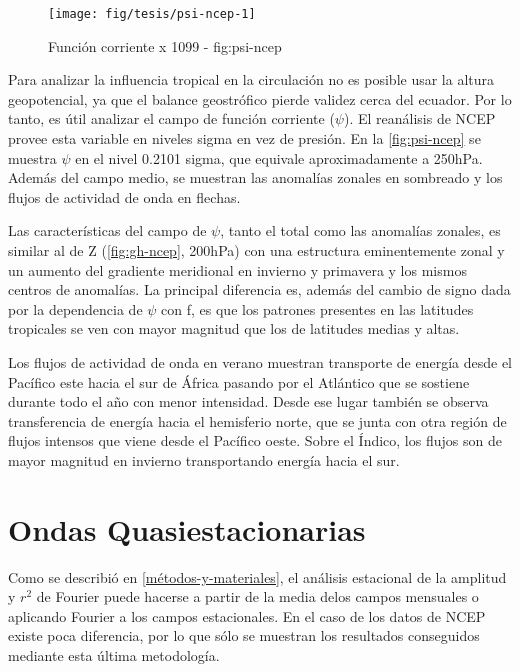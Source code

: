\documentclass[spanish,a4paper]{book}
\begin{document}
\begin{figure}

{\centering \texttt{[image: fig/tesis/psi-ncep-1]} 

}

\caption{Función corriente x 1099 - fig:psi-ncep}\label{fig:psi-ncep}
\end{figure}

Para analizar la influencia tropical en la circulación no es posible
usar la altura geopotencial, ya que el balance geostrófico pierde
validez cerca del ecuador. Por lo tanto, es útil analizar el campo de
función corriente (\(\psi\)). El reanálisis de NCEP provee esta variable
en niveles sigma en vez de presión. En la \autoref{fig:psi-ncep} se
muestra \(\psi\) en el nivel 0.2101 sigma, que equivale aproximadamente
a 250hPa. Además del campo medio, se muestran las anomalías zonales en
sombreado y los flujos de actividad de onda en flechas.

Las características del campo de \(\psi\), tanto el total como las
anomalías zonales, es similar al de Z (\autoref{fig:gh-ncep}, 200hPa)
con una estructura eminentemente zonal y un aumento del gradiente
meridional en invierno y primavera y los mismos centros de anomalías. La
principal diferencia es, además del cambio de signo dada por la
dependencia de \(\psi\) con f, es que los patrones presentes en las
latitudes tropicales se ven con mayor magnitud que los de latitudes
medias y altas.

Los flujos de actividad de onda en verano muestran transporte de energía
desde el Pacífico este hacia el sur de África pasando por el Atlántico
que se sostiene durante todo el año con menor intensidad. Desde ese
lugar también se observa transferencia de energía hacia el hemisferio
norte, que se junta con otra región de flujos intensos que viene desde
el Pacífico oeste. Sobre el Índico, los flujos son de mayor magnitud en
invierno transportando energía hacia el sur.

\section{Ondas Quasiestacionarias}\label{ondas-quasiestacionarias}

Como se describió en \autoref{métodos-y-materiales}, el análisis
estacional de la amplitud y \(r^2\) de Fourier puede hacerse a partir de
la media delos campos mensuales o aplicando Fourier a los campos
estacionales. En el caso de los datos de NCEP existe poca diferencia,
por lo que sólo se muestran los resultados conseguidos mediante esta
última metodología.
\end{document}

